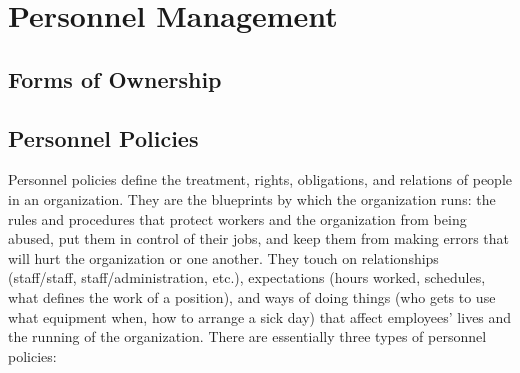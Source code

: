 \section{Personnel Management}
\subsection{Forms of Ownership}
\subsection{Personnel Policies}
Personnel policies define the treatment, rights, obligations, and relations of people in an organization. They
are the blueprints by which the organization runs: the rules and procedures that protect workers and the
organization from being abused, put them in control of their jobs, and keep them from making errors that will
hurt the organization or one another. They touch on relationships (staff/staff, staff/administration, etc.),
expectations (hours worked, schedules, what defines the work of a position), and ways of doing things (who
gets to use what equipment when, how to arrange a sick day) that affect employees' lives and the running of
the organization.
There are essentially three types of personnel policies:

